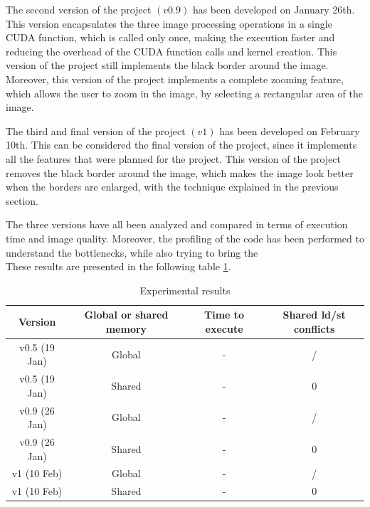     The second version of the project $(v0.9)$ has been developed on January 26th. This version encapsulates the three image processing operations in a single CUDA function,
    which is called only once, making the execution faster and reducing the overhead of the CUDA function calls and kernel creation. 
    This version of the project still implements the black border around the image.
    Moreover, this version of the project implements a complete zooming feature, which allows the user to zoom in the image, by selecting a rectangular area of the image.

    The third and final version of the project $(v1)$ has been developed on February 10th. This can be considered the final version of the project, since it implements all the features
    that were planned for the project. This version of the project removes the black border around the image, which makes the image look better when the borders are enlarged, with the technique
    explained in the previous section. 

    The three versions have all been analyzed and compared in terms of execution time and image quality. Moreover, the profiling of the code has been performed to understand the bottlenecks, while 
    also trying to bring the \\%
    These results are presented in the following table \ref{tab:expres}.
    \small
    \begin{table}[ht]
        \begin{tabular}{|c|c|c|c|}
            \hline
            Version & Global or shared memory& Time to execute & Shared ld/st conflicts \\
            \hline
            v0.5 (19 Jan) & Global & - & /\\
            \hline
            v0.5 (19 Jan) & Shared & - & 0\\
            \hline
            v0.9 (26 Jan) & Global & - & /\\
            \hline
            v0.9 (26 Jan) & Shared & - & 0\\
            \hline
            v1 (10 Feb) & Global & - & /\\
            \hline
            v1 (10 Feb) & Shared & - & 0\\
            \hline
        \end{tabular}
        \caption{Experimental results}
        \label{tab:expres}
    \end{table}

